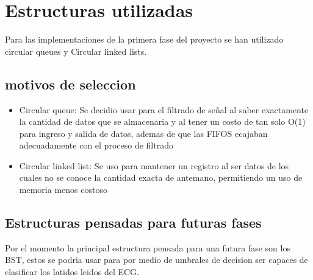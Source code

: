 \section{Estructuras utilizadas}
\label{sec:Estructuras}
Para las implementaciones de la primera fase del proyecto se han utilizado circular queues y Circular linked lists.
\subsection{motivos de seleccion}
\begin{itemize}
\item Circular queue: Se decidio usar para el filtrado de señal al saber exactamente la cantidad de datos que se almacenaria y al tener un costo de tan solo O(1) para ingreso y salida de datos, ademas de que las FIFOS ecajaban adecuadamente con el proceso de filtrado
\item Circular linked list: Se uso para mantener un registro al ser datos de los cuales no se conoce la cantidad exacta de antemano, permitiendo un uso de memoria menos costoso
\end{itemize}

\subsection{Estructuras pensadas para futuras fases}
Por el momento la principal estructura pensada para una futura fase son los BST, estos se podria usar para por medio de umbrales de decision ser capaces de clasificar los latidos leidos del ECG.



